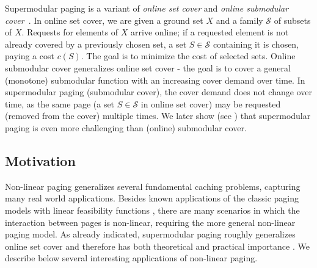 \documentclass[11pt]{article}
\newcommand{\cS}{{\mathcal{S}}}
\begin{document}
 
   
   
Supermodular paging is a variant of {\em online set cover} \cite{alon2003online} and {\em online submodular cover}~\cite{gupta2020online}. In online set cover, we are given  a ground set $X$ and a family $\cS$ of subsets of $X$. Requests for  elements of $X$ arrive online; if a requested element is not already covered by a previously chosen set,  a set $S \in \cS$ containing it is chosen, paying a cost $c(S)$. The goal is to minimize the cost of selected sets. Online submodular cover generalizes online set cover - the goal is to cover a general (monotone) submodular function with an increasing cover demand over time. %
In supermodular paging (submodular cover), the cover demand does not change over time, as the same page (a set $S \in \cS$ in online set cover) may be requested (removed from the cover) multiple times. We later show (see ) that supermodular paging is even more challenging than (online) submodular cover. %
   
   
   
   \subsection{Motivation}
   \label{sec:motivation}
   
   Non-linear paging generalizes several fundamental caching problems, capturing many real world applications. Besides known applications of the classic paging models with linear feasibility functions \cite{sleator1985amortized,fiat1991competitive,bansal2012primal,bansal2012randomized,adamaszek2018log}, there are many scenarios in which the interaction between pages is non-linear, requiring the more general non-linear paging model. 
   As already indicated, supermodular paging roughly generalizes online set cover and therefore has both theoretical and practical importance \cite{gupta2020online,alon2003online}. We describe below several interesting applications of non-linear paging.   
\end{document}

